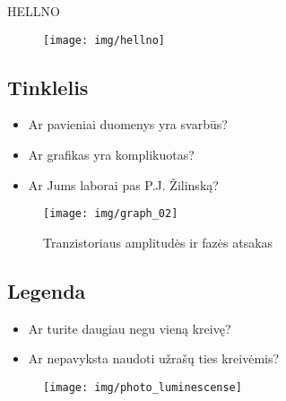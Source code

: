\documentclass{beamer}
\makeatletter
\newcommand*{\currentname}{\@currentlabelname}
\makeatother
\begin{document}
\begin{frame}{\textcolor{text_grey}{HELL}NO}
  \begin{figure}[h]
    \texttt{[image: img/hellno]}
  \end{figure} 
\end{frame}


\subsection{Tinklelis}
\frame{\tableofcontents[currentsection, subsectionstyle=show/shaded/hide]}
\begin{frame}{\currentname}
  \begin{itemize}[<+->]
    \item Ar pavieniai duomenys yra svarbūs?
    \item Ar grafikas yra komplikuotas?
    \item Ar Jums laborai pas P.J. Žilinską?
  \end{itemize}
\end{frame}

\begin{frame}{\currentname}
  \begin{figure}
    \begin{center} 
      \texttt{[image: img/graph\_02]}
      \caption*{Tranzistoriaus amplitudės ir fazės atsakas}
    \end{center}
  \end{figure}
\end{frame}

\subsection{Legenda}
\frame{\tableofcontents[currentsection, subsectionstyle=show/shaded/hide]}
\begin{frame}{\currentname}
  \begin{itemize}[<+->]
    \item Ar turite daugiau negu vieną kreivę?
    \item Ar nepavyksta naudoti užrašų ties kreivėmis?
  \end{itemize}
\end{frame}

\begin{frame}{\currentname}
 \begin{figure}[h]
    \texttt{[image: img/photo\_luminescense]}
  \end{figure} 
\end{frame}
\end{document}
